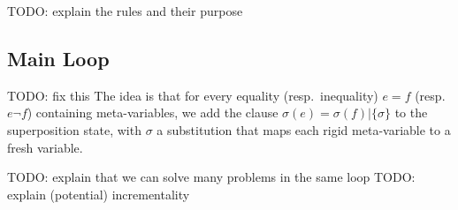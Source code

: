 TODO: explain the rules and their purpose


\subsection{Main Loop}

TODO: fix this
The idea is that for every equality (resp.~inequality) $e = f$ (resp.~$e \neg f$) containing meta-variables,
we add the clause $\sigma(e) = \sigma(f) | \{ \sigma \}$ to the superposition state, with
$\sigma$ a substitution that maps each rigid meta-variable to a fresh variable.

TODO: explain that we can solve many problems in the same loop
TODO: explain (potential) incrementality


